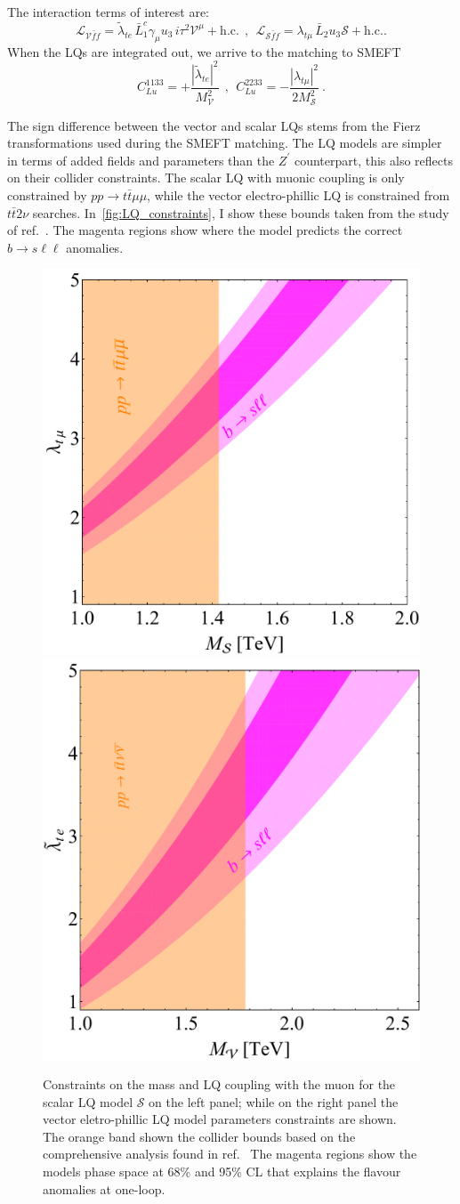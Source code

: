 The interaction terms of interest are:
\begin{equation}
	\mathcal{L}_{\mathcal V \bar f f} =  \tilde \lambda_{t e}  \, \bar L^c_1\gamma_\mu u_{3} \, i \tau^2 \mathcal V^\mu  + \mathrm{h.c.} 
	\ \ , \ \
	\mathcal{L}_{\mathcal S \bar f f} =  \lambda_{t \mu} \,  \bar L_2 u_{3} \mathcal{S}  + \mathrm{h.c.}.
\end{equation}
When the LQs are integrated out, we arrive to the matching to SMEFT
\begin{equation}
	C_{Lu}^{1133} = +\frac{| \tilde \lambda_{t e}|^2}{M_{\mathcal V} ^2 }  
	\ \ , \ \ C_{Lu}^{2233} = -\frac{|  \lambda_{t \mu}|^2}{2 M_{\mathcal S}^2 } \ .
\end{equation}
\par The sign difference between the vector and scalar LQs stems from the Fierz transformations used during the SMEFT matching.
The LQ models are simpler in terms of added fields and parameters than the $Z^\prime$ counterpart, this also reflects on their collider constraints. The scalar LQ with muonic coupling is only constrained by $pp \to t \bar t \mu \mu$, while the vector electro-phillic LQ is constrained from $t \bar t 2 \nu$ searches. 
In~\autoref{fig:LQ_constraints}, I show these bounds taken from the study of ref.~\cite{Angelescu:2018tyl}. The magenta regions show where the model predicts the correct $b \to s \ell \ell$ anomalies.
\begin{figure}[htpb!]
	\centering 
	\includegraphics[width=0.45\linewidth]{figures/Scalar_LQ.pdf}
	\includegraphics[width=0.435\linewidth]{figures/Vector_LQ.pdf}
	\caption{Constraints on the mass and LQ coupling with the muon for the scalar LQ model $\mathcal S$ on the left panel; while on the right panel the vector eletro-phillic LQ model parameters constraints are shown. The orange band shown the collider bounds based on the comprehensive analysis found in ref.~\cite{Angelescu:2018tyl} The magenta regions show the models phase space at 68\% and 95\% CL that explains the flavour anomalies at one-loop.}    
	\label{fig:LQ_constraints}
\end{figure}
